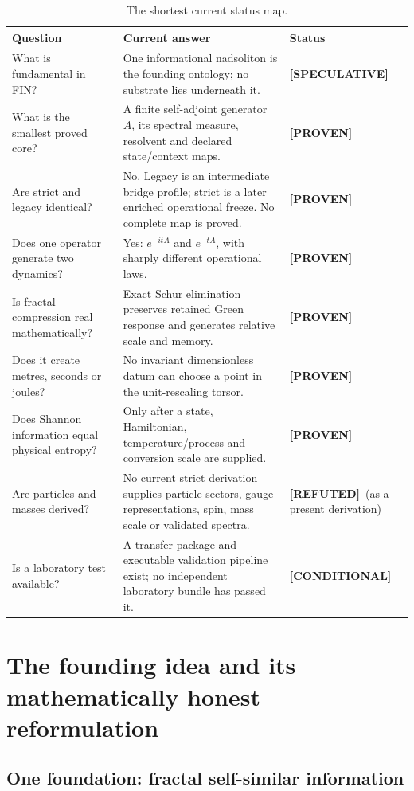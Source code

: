 \documentclass[11pt,a4paper]{article}
\theoremstyle{definition}
\theoremstyle{remark}
\newcommand{\status}[2]{\textcolor{#1}{\textbf{[#2]}}}
\newcommand{\proven}{\status{fingreen}{PROVEN}}
\newcommand{\speculative}{\status{finpurple}{SPECULATIVE}}
\newcommand{\refuted}{\status{finred}{REFUTED}}
\newcommand{\conditional}{\status{fingray}{CONDITIONAL}}
\begin{document}
\begin{table}[H]
\centering
\caption{The shortest current status map.}
\begin{tabularx}{\textwidth}{@{}p{}X p{}@{}}
\toprule
Question & Current answer & Status\\
\midrule
What is fundamental in FIN? & One informational nadsoliton is the founding ontology; no substrate lies underneath it. & \speculative\\
What is the smallest proved core? & A finite self-adjoint generator $A$, its spectral measure, resolvent and declared state/context maps. & \proven\\
Are strict and legacy identical? & No. Legacy is an intermediate bridge profile; strict is a later enriched operational freeze. No complete map is proved. & \proven\\
Does one operator generate two dynamics? & Yes: $e^{-itA}$ and $e^{-tA}$, with sharply different operational laws. & \proven\\
Is fractal compression real mathematically? & Exact Schur elimination preserves retained Green response and generates relative scale and memory. & \proven\\
Does it create metres, seconds or joules? & No invariant dimensionless datum can choose a point in the unit-rescaling torsor. & \proven\\
Does Shannon information equal physical entropy? & Only after a state, Hamiltonian, temperature/process and conversion scale are supplied. & \proven\\
Are particles and masses derived? & No current strict derivation supplies particle sectors, gauge representations, spin, mass scale or validated spectra. & \refuted\ (as a present derivation)\\
Is a laboratory test available? & A transfer package and executable validation pipeline exist; no independent laboratory bundle has passed it. & \conditional\\
\bottomrule
\end{tabularx}
\end{table}

\section{The founding idea and its mathematically honest reformulation}

\subsection{One foundation: fractal self-similar information}
\end{document}
